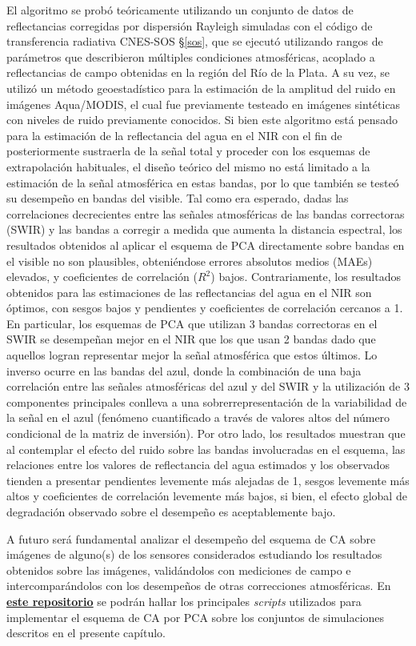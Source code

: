     El algoritmo se probó teóricamente utilizando un conjunto de datos de reflectancias corregidas por dispersión Rayleigh simuladas con el código de transferencia radiativa CNES-SOS \S \ref{sos}, que se ejecutó utilizando rangos de parámetros que describieron múltiples condiciones atmosféricas, acoplado a reflectancias de campo obtenidas en la región del Río de la Plata.
    A su vez, se utilizó un método geoestadístico para la estimación de la amplitud del ruido en imágenes Aqua/MODIS, el cual fue previamente testeado en imágenes sintéticas con niveles de ruido previamente conocidos.
    Si bien este algoritmo está pensado para la estimación de la reflectancia del agua en el NIR con el fin de posteriormente sustraerla de la señal total y proceder con los esquemas de extrapolación habituales, el diseño teórico del mismo no está limitado a la estimación de la señal atmosférica en estas bandas, por lo que también se testeó su desempeño en bandas del visible. Tal como era esperado, dadas las correlaciones decrecientes entre las señales atmosféricas de las bandas correctoras (SWIR) y las bandas a corregir a medida que aumenta la distancia espectral, los resultados obtenidos al aplicar el esquema de PCA directamente sobre bandas en el visible no son plausibles, obteniéndose errores absolutos medios (MAEs) elevados, y coeficientes de correlación ($R^{2}$) bajos.
    Contrariamente, los resultados obtenidos para las estimaciones de las reflectancias del agua en el NIR son óptimos, con sesgos bajos y pendientes y coeficientes de correlación cercanos a 1. En particular, los esquemas de PCA que utilizan 3 bandas correctoras en el SWIR se desempeñan mejor en el NIR que los que usan 2 bandas dado que aquellos logran representar mejor la señal atmosférica que estos últimos. Lo inverso ocurre en las bandas del azul, donde la combinación de una baja correlación entre las señales atmosféricas del azul y del SWIR y la utilización de 3 componentes principales conlleva a una sobrerrepresentación de la variabilidad de la señal en el azul (fenómeno cuantificado a través de valores altos del número condicional de la matriz de inversión).
    Por otro lado, los resultados muestran que al contemplar el efecto del ruido sobre las bandas involucradas en el esquema, las relaciones entre los valores de reflectancia del agua estimados y los observados tienden a presentar pendientes levemente más alejadas de 1, sesgos levemente más altos y coeficientes de correlación levemente más bajos, si bien, el efecto global de degradación observado sobre el desempeño es aceptablemente bajo.  
    
    A futuro será fundamental analizar el desempeño del esquema de CA sobre imágenes de alguno(s) de los sensores considerados estudiando los resultados obtenidos sobre las imágenes, validándolos con mediciones de campo e intercomparándolos con los desempeños de otras correcciones atmosféricas. En \href{https://github.com/juanchossn/scripts_tesis_doctoral}{\textbf{\underline{este repositorio}}}\cite{repo} se podrán hallar los principales \textit{scripts} utilizados para implementar el esquema de CA por PCA  sobre los conjuntos de simulaciones descritos en el presente capítulo.
